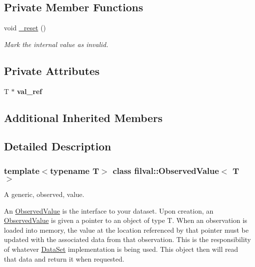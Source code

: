 \subsection*{Private Member Functions}
\begin{DoxyCompactItemize}
\item 
void \hyperlink{classfilval_1_1ObservedValue_a68c4fc1eb89682c7b16d2d46874f5421}{\+\_\+reset} ()
\begin{DoxyCompactList}\small\item\em Mark the internal value as invalid. \end{DoxyCompactList}\end{DoxyCompactItemize}
\subsection*{Private Attributes}
\begin{DoxyCompactItemize}
\item 
\hypertarget{classfilval_1_1ObservedValue_ad943ba7c4ff0d7d601d961c563f01826}{}\label{classfilval_1_1ObservedValue_ad943ba7c4ff0d7d601d961c563f01826} 
T $\ast$ {\bfseries val\+\_\+ref}
\end{DoxyCompactItemize}
\subsection*{Additional Inherited Members}


\subsection{Detailed Description}
\subsubsection*{template$<$typename T$>$\newline
class filval\+::\+Observed\+Value$<$ T $>$}

A generic, observed, value. 

An \hyperlink{classfilval_1_1ObservedValue}{Observed\+Value} is the interface to your dataset. Upon creation, an \hyperlink{classfilval_1_1ObservedValue}{Observed\+Value} is given a pointer to an object of type T. When an observation is loaded into memory, the value at the location referenced by that pointer must be updated with the associated data from that observation. This is the responsibility of whatever \hyperlink{classfilval_1_1DataSet}{Data\+Set} implementation is being used. This object then will read that data and return it when requested. 

